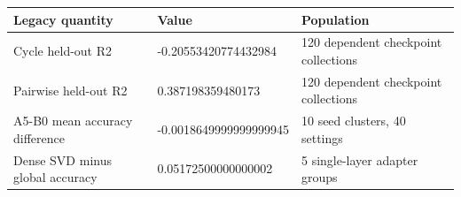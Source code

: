 \begin{tabular}{lll}
\hline
Legacy quantity & Value & Population \\
\hline
Cycle held-out R2 & -0.20553420774432984 & 120 dependent checkpoint collections \\
Pairwise held-out R2 & 0.387198359480173 & 120 dependent checkpoint collections \\
A5-B0 mean accuracy difference & -0.0018649999999999945 & 10 seed clusters, 40 settings \\
Dense SVD minus global accuracy & 0.05172500000000002 & 5 single-layer adapter groups \\
\hline
\end{tabular}
